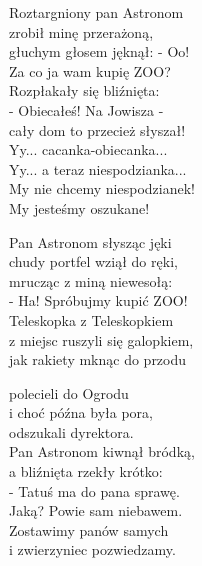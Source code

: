 \documentclass[11pt,a4pape,leqno,twoside]{book}
\begin{document}
Roztargniony pan Astronom\\
zrobił minę przerażoną,\\
głuchym głosem jęknął: - Oo!\\
Za co ja wam kupię ZOO?\\
Rozpłakały się bliźnięta:\\
- Obiecałeś! Na Jowisza -\\
cały dom to przecież słyszał!\\
Yy... cacanka-obiecanka...\\
Yy... a teraz niespodzianka...\\
My nie chcemy niespodzianek!\\
My jesteśmy oszukane!\\ \vspace{0.1cm}

Pan Astronom słysząc jęki\\
chudy portfel wziął do ręki,\\
mrucząc z miną niewesołą:\\
- Ha! Spróbujmy kupić ZOO!\\
Teleskopka z Teleskopkiem\\
z miejsc ruszyli się galopkiem,\\
jak rakiety mknąc do przodu\\ \vspace{0.1cm}

polecieli do Ogrodu\\
i choć późna była pora,\\
odszukali dyrektora.\\
Pan Astronom kiwnął bródką,\\
a bliźnięta rzekły krótko:\\
- Tatuś ma do pana sprawę.\\
Jaką? Powie sam niebawem.\\
Zostawimy panów samych\\
i zwierzyniec pozwiedzamy.\\ \vspace{0.1cm}
\end{document}

